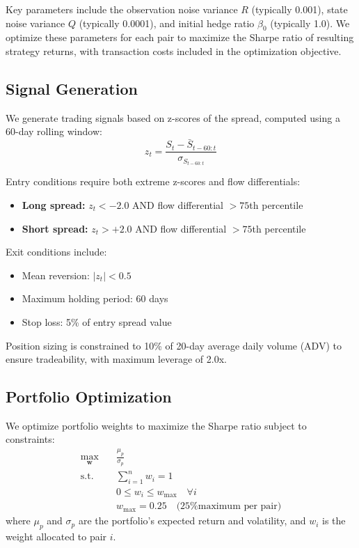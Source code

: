 \documentclass[12pt]{article}
\begin{document}
Key parameters include the observation noise variance $R$ (typically 0.001), state noise variance $Q$ (typically 0.0001), and initial hedge ratio $\beta_0$ (typically 1.0). We optimize these parameters for each pair to maximize the Sharpe ratio of resulting strategy returns, with transaction costs included in the optimization objective.

\subsection{Signal Generation}

We generate trading signals based on z-scores of the spread, computed using a 60-day rolling window:
\begin{equation}
z_t = \frac{S_t - \bar{S}_{t-60:t}}{\sigma_{S_{t-60:t}}}
\end{equation}

Entry conditions require both extreme z-scores and flow differentials:
\begin{itemize}
    \item \textbf{Long spread:} $z_t < -2.0$ AND flow differential $> 75$th percentile
    \item \textbf{Short spread:} $z_t > +2.0$ AND flow differential $> 75$th percentile
\end{itemize}

Exit conditions include:
\begin{itemize}
    \item Mean reversion: $|z_t| < 0.5$
    \item Maximum holding period: 60 days
    \item Stop loss: 5\% of entry spread value
\end{itemize}

Position sizing is constrained to 10\% of 20-day average daily volume (ADV) to ensure tradeability, with maximum leverage of 2.0x.

\subsection{Portfolio Optimization}

We optimize portfolio weights to maximize the Sharpe ratio subject to constraints:
\begin{align}
\max_{\mathbf{w}} \quad & \frac{\mu_p}{\sigma_p} \\
\text{s.t.} \quad & \sum_{i=1}^{n} w_i = 1 \\
& 0 \leq w_i \leq w_{\max} \quad \forall i \\
& w_{\max} = 0.25 \quad \text{(25\% maximum per pair)}
\end{align}
where $\mu_p$ and $\sigma_p$ are the portfolio's expected return and volatility, and $w_i$ is the weight allocated to pair $i$.
\end{document}
